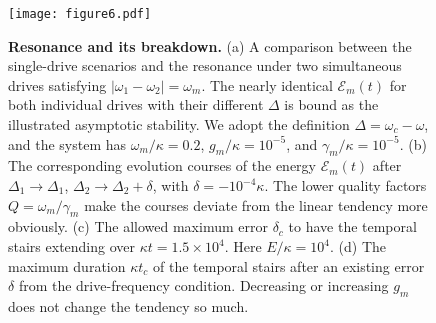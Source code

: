 \documentclass[a4paper,fleqn]{cas-dc}
\begin{document}
\begin{figure}
	\centering
		\texttt{[image: figure6.pdf]}
	\caption{{\bf Resonance and its breakdown.} (a) A comparison between the single-drive scenarios 
and the resonance under two simultaneous drives satisfying $|\omega_1-\omega_2|=\omega_m$. The nearly identical $\mathcal{E}_m(t)$ for both individual drives with their different $\Delta$ is bound as the illustrated asymptotic stability. We adopt the definition $\Delta=\omega_c-\omega$, and the system has $\omega_m/\kappa=0.2$, $g_m/\kappa=10^{-5}$, and $\gamma_m/\kappa=10^{-5}$. (b) The corresponding evolution courses of the energy $\mathcal{E}_m(t)$ after $\Delta_1\rightarrow \Delta_1$, $\Delta_2\rightarrow \Delta_2+\delta$, with $\delta=-10^{-4}\kappa$. The lower quality factors $Q=\omega_m/\gamma_m$ make the courses deviate from the linear tendency more obviously. (c) The allowed maximum error $\delta_c$ to have the temporal stairs extending over $\kappa t=1.5\times 10^4$. Here $E/\kappa=10^4$. (d) The maximum duration $\kappa t_c$ of the temporal stairs after an existing error $\delta$ from the drive-frequency condition. Decreasing or increasing $g_m$ does not change the tendency so much.}
	\label{FIG:6}
\end{figure}
\end{document}
